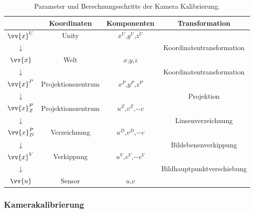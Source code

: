 \begin{table}
	\centering
	\renewcommand{\arraystretch}{1.4}
	\begin{tabular}{|c|c|c|c|}
		\hline
		\Absatzbox{}
		& \textbf{Koordinaten} & \textbf{Komponenten}&\textbf{Transformation}\\
		\hline
		$\vv{x}^U$ & Unity &$x^U$,$y^U$,$z^U$& \\
		\cline{2-4}
		$\downarrow$ & & & Koordinatentransformation\\
		\cline{2-4}
		$\vv{x}$ & Welt &$x$,$y$,$z$&  \\
		\cline{2-4}
		$\downarrow$ & & & Koordinatentransformation\\
		\cline{2-4}
		$\vv{x}^P$ & Projektionszentrum &$x^P$,$y^P$,$z^P$& \\
		\cline{2-4}
		$\downarrow$ & & & Projektion \\
		\cline{2-4}
		$\vv{x}^P_Z$ & Projektionszentrum &$u^Z$,$v^Z$,$-c$& \\
		\cline{2-4}
		$\downarrow$ & & & Linsenverzeichnung\\
		\cline{2-4}	
		$\vv{x}^P_D$ & Verzeichnung &$u^D$,$v^D$,$-c$& \\
		\cline{2-4}
		$\downarrow$ & & & Bildebenenverkippung\\
		\cline{2-4}		
		$\vv{x}^V$ &Verkippung &$u^V$,$v^V$,$-c^V$& \\
		\cline{2-4}
		$\downarrow$ & & & Bildhauptpunktverschiebung\\
		\cline{2-4}	
		$\vv{u}$ & Sensor &$u$,$v$ & \\
		\hline
	\end{tabular}
	\caption{Parameter und Berechnungsschritte der Kamera Kalibrierung.\cite{Meisel:77890}}
	\label{tab:camCalibParam}
\end{table}

\subsubsection{Kamerakalibrierung}\label{sec:camCalib}

